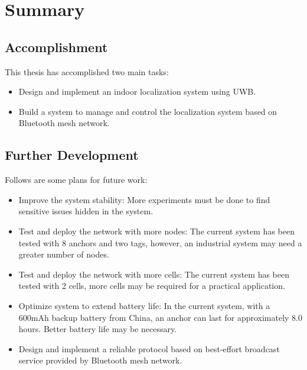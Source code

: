 \documentclass[\main/main.tex]{subfiles}
\begin{document}
\graphicspath{{img/}{summary/img/}}

\chapter{Summary}

\section{Accomplishment}
This thesis has accomplished two main tasks:
\begin{itemize}
    \item Design and implement an indoor localization system using UWB.
    \item Build a system to manage and control the localization system based on Bluetooth mesh network.
\end{itemize}

\section{Further Development}
Follows are some plans for future work:
\begin{itemize}
    \item Improve the system stability: More experiments must be done to find sensitive issues hidden in the system.
    \item Test and deploy the network with more nodes: The current system has been tested with 8 anchors and two tags, however, an industrial system may need a greater number of nodes.
    \item Test and deploy the network with more cells: The current system has been tested with 2 cells, more cells may be required for a practical application.
    \item Optimize system to extend battery life: In the current system, with a 600mAh backup battery from China, an anchor can last for approximately 8.0 hours. Better battery life may be necessary.
    \item Design and implement a reliable protocol based on best-effort broadcast service provided by Bluetooth mesh network.
\end{itemize}
\end{document}
